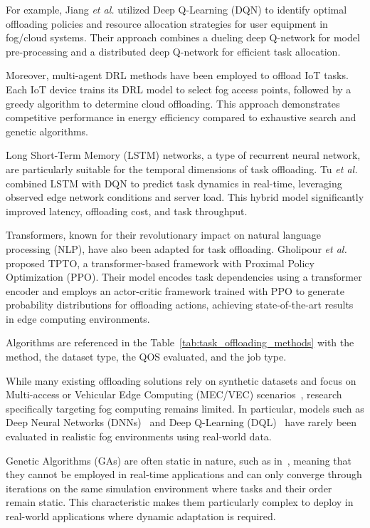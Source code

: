 \documentclass[preprint,12pt]{elsarticle}
\begin{document}
For example, Jiang \textit{et al.} \cite{jiang_reinforcement_2021} utilized Deep Q-Learning (DQN) to identify optimal offloading policies and resource allocation strategies for user equipment in fog/cloud systems. Their approach combines a dueling deep Q-network for model pre-processing and a distributed deep Q-network for efficient task allocation.



Moreover, multi-agent DRL methods \cite{ren_deep_2021} have been employed to offload IoT tasks. Each IoT device trains its DRL model to select fog access points, followed by a greedy algorithm to determine cloud offloading. This approach demonstrates competitive performance in energy efficiency compared to exhaustive search and genetic algorithms.


Long Short-Term Memory (LSTM) networks, a type of recurrent neural network, are particularly suitable for the temporal dimensions of task offloading. Tu \textit{et al.} \cite{tu_task_2022} combined LSTM with DQN to predict task dynamics in real-time, leveraging observed edge network conditions and server load. This hybrid model significantly improved latency, offloading cost, and task throughput.

Transformers, known for their revolutionary impact on natural language processing (NLP), have also been adapted for task offloading. Gholipour \textit{et al.} \cite{gholipour_tpto_2023} proposed TPTO, a transformer-based framework with Proximal Policy Optimization (PPO). Their model encodes task dependencies using a transformer encoder and employs an actor-critic framework trained with PPO to generate probability distributions for offloading actions, achieving state-of-the-art results in edge computing environments.

Algorithms are referenced in the Table~\ref{tab:task_offloading_methods} with the method, the dataset type, the QOS evaluated, and the job type. 


While many existing offloading solutions rely on synthetic datasets and focus on Multi-access or Vehicular Edge Computing (MEC/VEC) scenarios~\cite{fahimullah_review_2022, tu_task_2022, gholipour_tpto_2023}, research specifically targeting fog computing remains limited. In particular, models such as Deep Neural Networks (DNNs)~\cite{sarkar_deep_2022} and Deep Q-Learning (DQL)~\cite{jiang_reinforcement_2021} have rarely been evaluated in realistic fog environments using real-world data.

Genetic Algorithms (GAs) are often static in nature, such as in~\cite{bernard_d-npga_2024, pakmehr_etfc_2024}, meaning that they cannot be employed in real-time applications and can only converge through iterations on the same simulation environment where tasks and their order remain static. This characteristic makes them particularly complex to deploy in real-world applications where dynamic adaptation is required.
\end{document}
